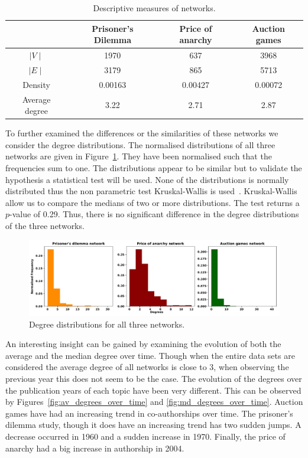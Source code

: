 \documentclass{article}
\begin{document}
\begin{table}[!hbtp]
    \begin{center}
    \begin{tabular}{cccc}
\toprule
& Prisoner's Dilemma & Price of anarchy &  Auction games \\
\midrule
\(\mid V \mid \)                   & 1970    & 637 & 3968 \\
\(\mid E \mid \)                   & 3179    & 865 & 5713 \\
Density                            & 0.00163 & 0.00427 & 0.00072\\
Average degree                     & 3.22    & 2.71 & 2.87 \\
\bottomrule
    \end{tabular}
    \end{center}
    \caption{Descriptive measures of networks.}\label{table:descriptive_networks}
\end{table}

To further examined the differences or the similarities of these networks we 
consider the degree distributions. The normalised distributions of all
three networks are given in Figure~\ref{fig:degrees_dist}. They have been normalised
such that the frequencies sum to one. The distributions appear to be similar
but to validate the hypothesis a statistical test will be used. None of the
distributions is normally distributed thus the non parametric test Kruskal-Wallis
is used~\cite{mckight2010}. Kruskal-Wallis allow us to compare the medians of
two or more distributions. The test returns a \(p\)-value of 0.29. Thus, there is no
significant difference in the degree distributions of the three networks.

\begin{figure}[!hbtp]
    \centering
    \includegraphics[width=\textwidth]{./assets/images/degrees_histrograms.pdf}
    \caption{Degree distributions for all three networks.}\label{fig:degrees_dist}
\end{figure}

An interesting insight can be gained by examining the evolution of both the
average and the median degree over time. Though when the entire data sets are
considered the average degree of all networks is close to 3, when observing
the previous year this does not seem to be the case. The evolution of the 
degrees over the publication years of each topic have been very different.
This can be observed by Figures~\ref{fig:av_degrees_over_time} and
\ref{fig:md_degrees_over_time}. Auction games have had an increasing trend in
co-authorships over time. The prisoner's dilemma study, though it does have an
increasing trend has two sudden jumps. A decrease occurred in 1960 and a sudden
increase in 1970. Finally, the price of anarchy had a big increase in authorship
in 2004.
\end{document}
